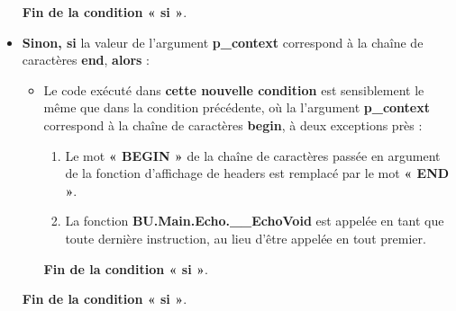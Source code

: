 \documentclass[a4paper,10pt]{article}
\begin{document}
\begin{itemize}
{\begin{itemize}
{                \begin{justify}
                    \textbf{\color{cond}Fin de la condition « si »}.
                \end{justify}
            }
        \end{itemize}
    }

    \item
    {
        \setlength{\parskip}{2em}

        \begin{justify}
            \textbf{\color{cond}Sinon, si} la valeur de l'argument \textbf{\color{vars}p\_context} correspond à la chaîne de caractères \textbf{end}, \textbf{\color{cond}alors} :
        \end{justify}

        \setlength{\parskip}{1em}

        \begin{itemize}
            \item
            {
                \begin{justify}
                    Le code exécuté dans \textbf{\color{cond}cette nouvelle condition} est sensiblement le même que dans la condition précédente, où la l'argument \textbf{\color{vars}p\_context} correspond à la chaîne de caractères \textbf{begin}, à deux exceptions près :

                    \begin{enumerate}
                        \item Le mot \textbf{« BEGIN »} de la chaîne de caractères passée en argument de la fonction d'affichage de headers est remplacé par le mot \textbf{« END »}.

                        \item La fonction \textbf{\color{func}BU.Main.Echo.\_\_EchoVoid} est appelée en tant que toute dernière instruction, au lieu d'être appelée en tout premier.
                    \end{enumerate}
                \end{justify}\setlength{\parskip}{1em}

                \begin{justify}
                    \textbf{\color{cond}Fin de la condition « si »}.
                \end{justify}
            }
        \end{itemize}

        \begin{justify}
            \textbf{\color{cond}Fin de la condition « si »}.
        \end{justify}
    }
\end{itemize}
\end{document}
